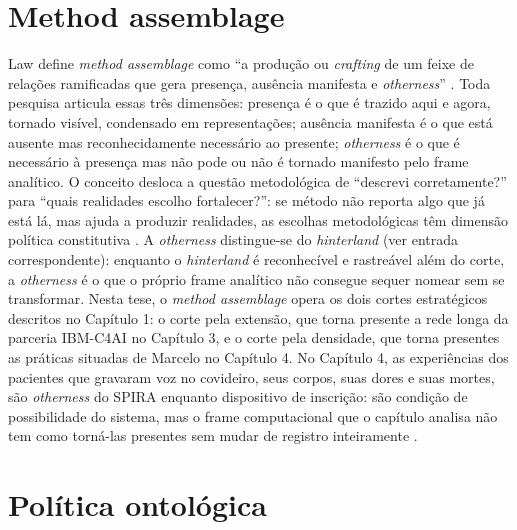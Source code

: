 \begin{description}
\bigskip

\section*{Method assemblage}

Law define \textit{method assemblage} como ``a produção ou \textit{crafting} de um feixe de relações ramificadas que gera presença, ausência manifesta e \textit{otherness}'' \parencite[p.~84]{Law2004After}. Toda pesquisa articula essas três dimensões: presença é o que é trazido aqui e agora, tornado visível, condensado em representações; ausência manifesta é o que está ausente mas reconhecidamente necessário ao presente; \textit{otherness} é o que é necessário à presença mas não pode ou não é tornado manifesto pelo frame analítico. O conceito desloca a questão metodológica de ``descrevi corretamente?'' para ``quais realidades escolho fortalecer?'': se método não reporta algo que já está lá, mas ajuda a produzir realidades, as escolhas metodológicas têm dimensão política constitutiva \parencite[p.~143]{Law2004After}. A \textit{otherness} distingue-se do \textit{hinterland} (ver entrada correspondente): enquanto o \textit{hinterland} é reconhecível e rastreável além do corte, a \textit{otherness} é o que o próprio frame analítico não consegue sequer nomear sem se transformar. Nesta tese, o \textit{method assemblage} opera os dois cortes estratégicos descritos no Capítulo 1: o corte pela extensão, que torna presente a rede longa da parceria IBM-C4AI no Capítulo 3, e o corte pela densidade, que torna presentes as práticas situadas de Marcelo no Capítulo 4. No Capítulo 4, as experiências dos pacientes que gravaram voz no covideiro, seus corpos, suas dores e suas mortes, são \textit{otherness} do SPIRA enquanto dispositivo de inscrição: são condição de possibilidade do sistema, mas o frame computacional que o capítulo analisa não tem como torná-las presentes sem mudar de registro inteiramente \parencite[pp.~83--85]{Law2004After}.

\bigskip

\section*{Política ontológica}


\end{description}

